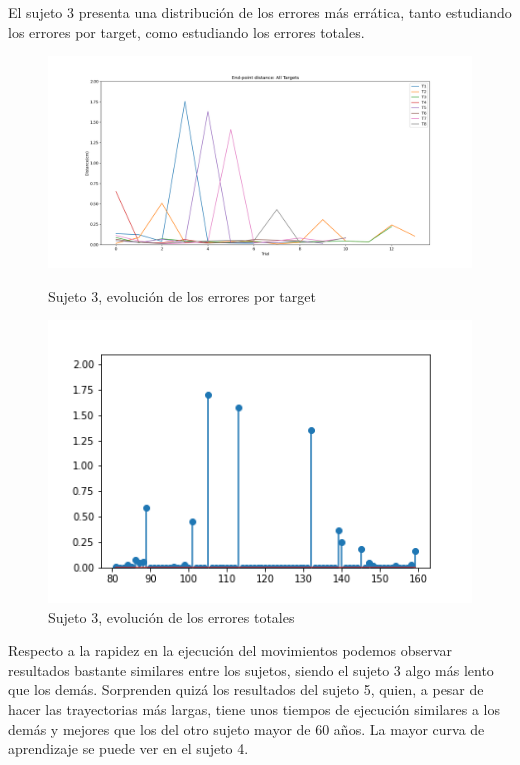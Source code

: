 \documentclass[a4paper,11pt, oneside]{book}
\begin{document}
El sujeto 3 presenta una distribución de los errores más errática, tanto estudiando los errores por target, como estudiando los errores totales.
\begin{figure}[H]
	\begin{minipage}[b]{0.5\linewidth}
		\centering
		\includegraphics[width=\linewidth]{sujeto3/force/evolution_distance}
		\caption{Sujeto 3, evolución de los errores por target}
		\label{fig:figura1}
	\end{minipage}
	\hspace{0.5cm}
	\begin{minipage}[b]{0.5\linewidth}
		\centering
		\includegraphics[width=\linewidth]{sujeto3/force/resumen_total}
		\caption{Sujeto 3, evolución de los errores totales}
		\label{fig:figura2}
	\end{minipage}
\end{figure}


Respecto a la rapidez en la ejecución del movimientos podemos observar resultados bastante similares entre los sujetos, siendo el sujeto 3 algo más lento que los demás. Sorprenden quizá los resultados del sujeto 5, quien, a pesar de hacer las trayectorias más largas, tiene unos tiempos de ejecución similares a los demás y mejores que los del otro sujeto mayor de 60 años. La mayor curva de aprendizaje se puede ver en el sujeto 4.
\end{document}
